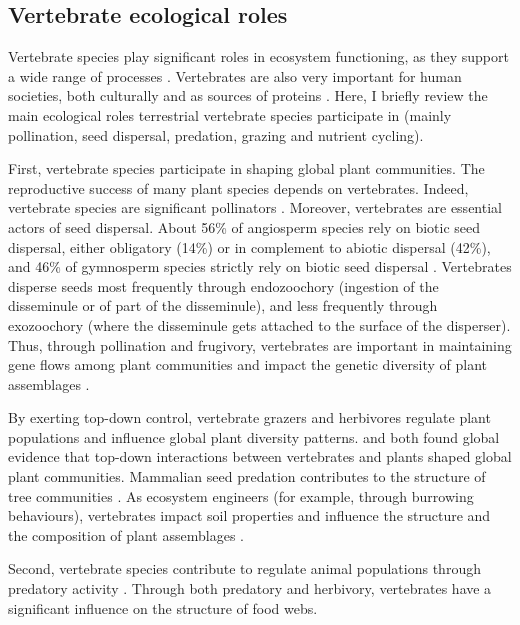 \subsection{Vertebrate ecological roles}
Vertebrate species play significant roles in ecosystem functioning, as they support a wide range of processes \citep{Sekercioglu2006, Severtsov2013, Hocking2014}. Vertebrates are also very important for human societies, both culturally and as sources of proteins \citep{Albert2018, Hirons2016,Alves2018}. Here, I briefly review the main ecological roles terrestrial vertebrate species participate in (mainly pollination, seed dispersal, predation, grazing and nutrient cycling).

First, vertebrate species participate in shaping global plant communities. The reproductive success of many plant species depends on vertebrates. Indeed, vertebrate species are significant pollinators \citep{Ratto2018}. Moreover, vertebrates are essential actors of seed dispersal. About 56\% of angiosperm species rely on biotic seed dispersal, either obligatory (14\%) or in complement to abiotic dispersal (42\%), and 46\% of gymnosperm species strictly rely on biotic seed dispersal \citep{Tiffney2004}. Vertebrates disperse seeds most frequently through endozoochory (ingestion of the disseminule or of part of the disseminule), and less frequently through exozoochory (where the disseminule gets attached to the surface of the disperser). Thus, through pollination and frugivory, vertebrates are important in maintaining gene flows among plant communities and impact the genetic diversity of plant assemblages \citep{Calvino-Cancela2012}.

By exerting top-down control, vertebrate grazers and herbivores regulate plant populations and influence global plant diversity patterns. \citet{Lin2018} and \citet{Zhang2018} both found global evidence that top-down interactions between vertebrates and plants shaped global plant communities. Mammalian seed predation contributes to the structure of tree communities \citep{Paine2016}. As ecosystem engineers (for example, through burrowing behaviours), vertebrates impact soil properties and influence the structure and the composition of plant assemblages \citep{Sekercioglu2006, Severtsov2013}.

Second, vertebrate species contribute to regulate animal populations through predatory activity \citep{Barber2010,Letnic2012, Luck2012, Salo2010}. Through both predatory and herbivory, vertebrates have a significant influence on the structure of food webs. 

